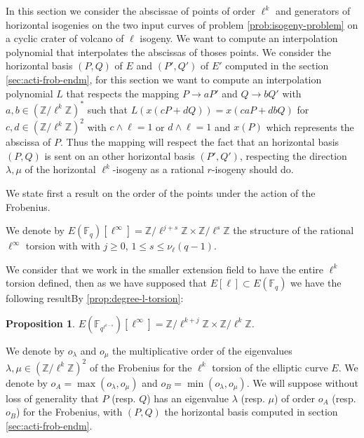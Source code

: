 \documentclass{lms}
\newtheorem{prop}[thm]{Proposition}
\begin{document}
In this section we consider the abscissae of points of order $\ell^k$ and generators of horizontal isogenies on the two input curves of problem \ref{prob:isogeny-problem} on a cyclic crater of volcano of $\ell$ isogeny. We want to compute an interpolation polynomial that interpolates the abscissas of thoses points. We consider the horizontal basis $(P,Q)$ of $E$ and $(P',Q')$ of $E'$ computed in the section \ref{sec:acti-frob-endm}, for this section we want to compute an interpolation polynomial $L$ that respects the mapping $P \rightarrow aP'$ and $Q \rightarrow bQ'$ with $a,b \in \left(\mathbb{Z}/\ell^k \mathbb{Z} \right)^*$ such that $L(x(cP+dQ))=x(caP+dbQ)$ for $c,d \in (\mathbb{Z}/\ell^k\mathbb{Z})^2$ with $c\wedge \ell=1$ or $d \wedge \ell =1$ and $x(P)$ which represents the abscissa of $P$. Thus the mapping will respect the fact that an horizontal basis $(P,Q)$ is sent on an other horizontal basis $(P',Q')$, respecting the direction $\lambda, \mu$ of the horizontal $\ell^k$-isogeny as a rational $r$-isogeny should do.


We state first a result on the order of the points under the action of the Frobenius.

\begin{defi}
We denote by $E(\mathbb{F}_q)[\ell^{\infty}]=\mathbb{Z}/\ell^{j+s}
\mathbb{Z} \times \mathbb{Z}/\ell^{s} \mathbb{Z}$ the structure of the rational $\ell^{\infty}$ torsion with with $j \geqslant 0$, $1 \leqslant s \leqslant \nu_\ell(q-1)$. 
\end{defi}
We consider that we work in the smaller extension field to have the entire $\ell^k$ torsion defined, then as we have supposed that $E[\ell] \subset E(\mathbb{F}_q)$ we have the following resultBy \ref{prop:degree-l-torsion}:

\begin{prop}
 $E(\mathbb{F}_{q^{\ell^{k-s}}})[\ell^{\infty}]=\mathbb{Z}/\ell^{k+j}
\mathbb{Z} \times \mathbb{Z}/\ell^{k} \mathbb{Z}$. 
\end{prop}

\begin{defi}
We denote by $o_{\lambda}$ and $o_{\mu}$ the multiplicative order of the
eigenvalues $\lambda , \mu \in (\mathbb{Z}/\ell^k\mathbb{Z})^2$ of the Frobenius for the
$\ell^{k}$ torsion of the elliptic curve $E$.
\newline
We denote by $o_A=\max(o_{\lambda},o_{\mu})$ and $o_B=\min(o_{\lambda},o_{\mu})$.
We will suppose without loss of generality that $P$ (resp. $Q$) has an eigenvalue $\lambda$ (resp. $\mu$) of order $o_A$ (resp. $o_B$) for the Frobenius, with $(P,Q)$ the horizontal basis computed in section \ref{sec:acti-frob-endm}.
\end{defi}
\end{document}
